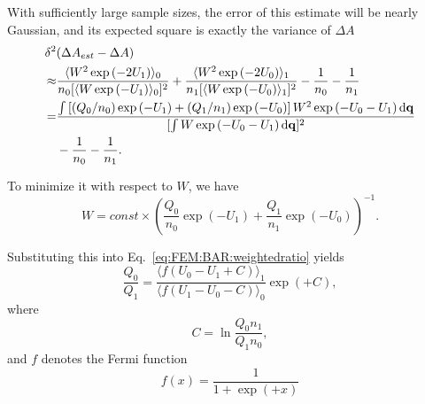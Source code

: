 With sufficiently large sample sizes, the error of this estimate will
be nearly Gaussian, and its expected square is exactly the variance
of $\Delta A$ 
\begin{align}
	\delta^2 & (\Delta A_{est}-\Delta A)\nonumber \\
	\approx & \frac{\langle W^{2}\exp{(-2U_{1})}\rangle_{0}}{n_{0}[\langle W\exp{(-U_{1})}\rangle_{0}]^{2}}+\frac{\langle W^{2}\exp{(-2U_{0})}\rangle_{1}}{n_{1}[\langle W\exp{(-U_{0})}\rangle_{1}]^{2}}-\frac{1}{n_{0}}-\frac{1}{n_{1}}\nonumber \\
	= & \frac{\int\left[(Q_{0}/n_{0})\exp{(-U_{1})}+(Q_{1}/n_{1})\exp{(-U_{0})}\right]W^{2}\exp{(-U_{0}-U_{1})}\mathop{}\!\mathrm{d}\mathbf{q}}{[\int W\exp{(-U_{0}-U_{1})}\mathop{}\!\mathrm{d}\mathbf{q}]^{2}}\notag\\
	  &-\frac{1}{n_{0}}-\frac{1}{n_{1}}.\label{eq:FEM:BAR:expectation}
\end{align}

To minimize it with respect to $W$, we have
\begin{equation}
	W=const\times\left(\frac{Q_{0}}{n_{0}}\exp{(-U_{1})}+\frac{Q_{1}}{n_{1}}\exp{(-U_{0})}\right)^{-1}.
\end{equation}

Substituting this into Eq.~\ref{eq:FEM:BAR:weightedratio} yields
\begin{equation}
	\frac{Q_{0}}{Q_{1}}=\frac{\langle f(U_{0}-U_{1}+C)\rangle_{1}}{\langle f(U_{1}-U_{0}-C)\rangle_{0}}\exp{(+C)},
	\label{Eq:FEM:BAR:BAR}
\end{equation}
where
\begin{equation}
	C=\ln\frac{Q_{0}n_{1}}{Q_{1}n_{0}},
\end{equation}
and $f$ denotes the Fermi function
\begin{equation}
	f(x)=\frac{1}{1+\exp{(+x)}}
\end{equation}